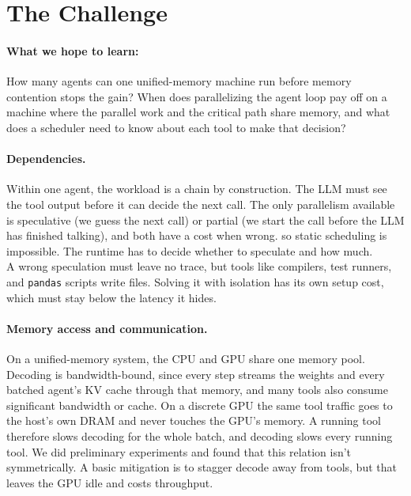 \documentclass[11pt]{article}
\newcommand{\code}[1]{\texttt{#1}}
\begin{document}
\section*{The Challenge}

\paragraph{What we hope to learn:}
How many agents can one unified-memory machine run before memory contention stops the gain?
When does parallelizing the agent loop pay off on a machine where the parallel work and the critical path share memory, and what does a scheduler need to know
about each tool to make that decision?

\paragraph{Dependencies.}
Within one agent, the workload is a chain by construction. The LLM must see the tool output before it can decide the next call. The only parallelism available is
speculative (we guess the next call) or partial (we start the
call before the LLM has finished talking), and both have a cost when wrong.
so static scheduling is impossible. The runtime has to decide
whether to speculate and how much.
\\
A wrong speculation must leave no trace, but tools like compilers, test runners, and
\code{pandas} scripts write files. Solving it with isolation has its own setup cost, which must stay below the latency it hides.


\paragraph{Memory access and communication.}
On a unified-memory system, the CPU and GPU share one memory pool. Decoding is bandwidth-bound, since every step streams the weights and every batched agent's KV cache through that memory, and many tools also consume significant bandwidth or cache.
On a discrete GPU the same tool traffic goes to the host's own DRAM and never
touches the GPU's memory.
A running tool therefore slows decoding for the whole batch, and decoding slows every running tool. We did preliminary experiments and found that this relation isn't symmetrically. A basic mitigation is to stagger decode away from tools, but that leaves the GPU idle and costs throughput.
\end{document}
